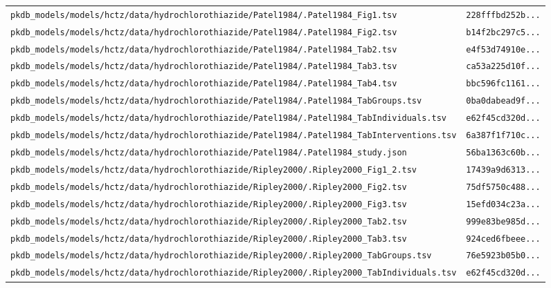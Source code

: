 \begin{longtable}{ll}
\texttt{pkdb\_models/models/hctz/data/hydrochlorothiazide/Patel1984/.Patel1984\_Fig1.tsv} & \texttt{228fffbd252b...} \\
\texttt{pkdb\_models/models/hctz/data/hydrochlorothiazide/Patel1984/.Patel1984\_Fig2.tsv} & \texttt{b14f2bc297c5...} \\
\texttt{pkdb\_models/models/hctz/data/hydrochlorothiazide/Patel1984/.Patel1984\_Tab2.tsv} & \texttt{e4f53d74910e...} \\
\texttt{pkdb\_models/models/hctz/data/hydrochlorothiazide/Patel1984/.Patel1984\_Tab3.tsv} & \texttt{ca53a225d10f...} \\
\texttt{pkdb\_models/models/hctz/data/hydrochlorothiazide/Patel1984/.Patel1984\_Tab4.tsv} & \texttt{bbc596fc1161...} \\
\texttt{pkdb\_models/models/hctz/data/hydrochlorothiazide/Patel1984/.Patel1984\_TabGroups.tsv} & \texttt{0ba0dabead9f...} \\
\texttt{pkdb\_models/models/hctz/data/hydrochlorothiazide/Patel1984/.Patel1984\_TabIndividuals.tsv} & \texttt{e62f45cd320d...} \\
\texttt{pkdb\_models/models/hctz/data/hydrochlorothiazide/Patel1984/.Patel1984\_TabInterventions.tsv} & \texttt{6a387f1f710c...} \\
\texttt{pkdb\_models/models/hctz/data/hydrochlorothiazide/Patel1984/.Patel1984\_study.json} & \texttt{56ba1363c60b...} \\
\texttt{pkdb\_models/models/hctz/data/hydrochlorothiazide/Ripley2000/.Ripley2000\_Fig1\_2.tsv} & \texttt{17439a9d6313...} \\
\texttt{pkdb\_models/models/hctz/data/hydrochlorothiazide/Ripley2000/.Ripley2000\_Fig2.tsv} & \texttt{75df5750c488...} \\
\texttt{pkdb\_models/models/hctz/data/hydrochlorothiazide/Ripley2000/.Ripley2000\_Fig3.tsv} & \texttt{15efd034c23a...} \\
\texttt{pkdb\_models/models/hctz/data/hydrochlorothiazide/Ripley2000/.Ripley2000\_Tab2.tsv} & \texttt{999e83be985d...} \\
\texttt{pkdb\_models/models/hctz/data/hydrochlorothiazide/Ripley2000/.Ripley2000\_Tab3.tsv} & \texttt{924ced6fbeee...} \\
\texttt{pkdb\_models/models/hctz/data/hydrochlorothiazide/Ripley2000/.Ripley2000\_TabGroups.tsv} & \texttt{76e5923b05b0...} \\
\texttt{pkdb\_models/models/hctz/data/hydrochlorothiazide/Ripley2000/.Ripley2000\_TabIndividuals.tsv} & \texttt{e62f45cd320d...} \\

\end{longtable}
